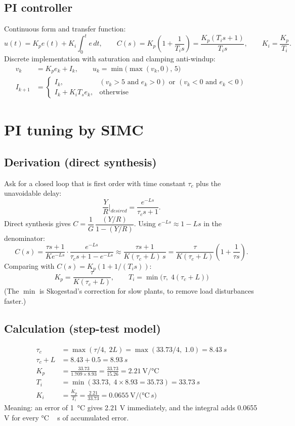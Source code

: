 \documentclass[11pt,a4paper]{article}
\begin{document}
\subsection{PI controller}
Continuous form and transfer function:
\[
u(t) = K_p e(t) + K_i\!\int_0^t e\,dt,\qquad
C(s) = K_p\left(1 + \frac{1}{T_i s}\right) = \frac{K_p(T_i s + 1)}{T_i s},\qquad K_i = \frac{K_p}{T_i}.
\]
Discrete implementation with saturation and clamping anti-windup:
\begin{align*}
v_k &= K_p e_k + I_k, \qquad u_k = \min\bigl(\max(v_k, 0),\, 5\bigr)\\
I_{k+1} &= \begin{cases} I_k, & (v_k > 5 \text{ and } e_k > 0) \text{ or } (v_k < 0 \text{ and } e_k < 0)\\ I_k + K_i T_s e_k, & \text{otherwise}\end{cases}
\end{align*}

\section{PI tuning by SIMC}

\subsection{Derivation (direct synthesis)}
Ask for a closed loop that is first order with time constant $\tau_c$ plus the unavoidable delay:
\[
\frac{Y}{R}\bigg|_{desired} = \frac{e^{-Ls}}{\tau_c s + 1}.
\]
Direct synthesis gives $C = \dfrac{1}{G}\,\dfrac{(Y/R)}{1 - (Y/R)}$. Using $e^{-Ls} \approx 1 - Ls$ in the
denominator:
\[
C(s) = \frac{\tau s + 1}{K e^{-Ls}}\cdot\frac{e^{-Ls}}{\tau_c s + 1 - e^{-Ls}}
\approx \frac{\tau s + 1}{K(\tau_c + L)\,s}
= \frac{\tau}{K(\tau_c+L)}\left(1 + \frac{1}{\tau s}\right).
\]
Comparing with $C(s) = K_p(1 + 1/(T_i s))$:
\[
\boxed{\;K_p = \frac{\tau}{K(\tau_c + L)},\qquad T_i = \min\bigl(\tau,\;4(\tau_c + L)\bigr)\;}
\]
(The $\min$ is Skogestad's correction for slow plants, to remove load disturbances faster.)

\subsection{Calculation (step-test model)}
\begin{align*}
\tau_c &= \max(\tau/4,\; 2L) = \max(33.73/4,\; 1.0) = \SI{8.43}{s}\\
\tau_c + L &= 8.43 + 0.5 = \SI{8.93}{s}\\
K_p &= \frac{33.73}{1.709\times 8.93} = \frac{33.73}{15.26} = \boxed{2.21\ \si{\volt\per\celsius}}\\
T_i &= \min(33.73,\; 4\times8.93 = 35.73) = \boxed{\SI{33.73}{s}}\\
K_i &= \frac{K_p}{T_i} = \frac{2.21}{33.73} = \boxed{0.0655\ \si{\volt\per(\celsius\,s)}}
\end{align*}
Meaning: an error of \SI{1}{\celsius} gives 2.21 V immediately, and the integral adds
0.0655 V for every \si{\celsius\,s} of accumulated error.
\end{document}
